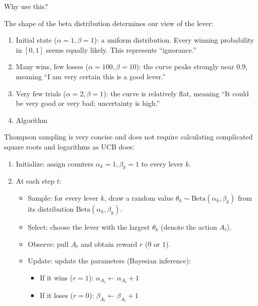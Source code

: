 Why use this?

The shape of the beta distribution determines our view of the lever:

\begin{enumerate}
\def\labelenumi{\arabic{enumi}.}
\item
  Initial state (\(\alpha=1,\beta=1\)): a uniform distribution. Every winning probability in \([0,1]\) seems equally likely. This represents ``ignorance.''
\item
  Many wins, few losses (\(\alpha=100,\beta=10\)): the curve peaks strongly near \(0.9\), meaning ``I am very certain this is a good lever.''
\item
  Very few trials (\(\alpha=2,\beta=1\)): the curve is relatively flat, meaning ``It could be very good or very bad; uncertainty is high.''
\item
  Algorithm
\end{enumerate}

Thompson sampling is very concise and does not require calculating complicated square roots and logarithms as UCB does:

\begin{enumerate}
\def\labelenumi{\arabic{enumi}.}
\tightlist
\item
  Initialize: assign counters \(\alpha_k=1,\beta_k=1\) to every lever \(k\).
\item
{}
  At each step \(t\):

  \begin{itemize}
  \item
    Sample: for every lever \(k\), draw a random value \(\theta_k\sim \mathrm{Beta}(\alpha_k,\beta_k)\) from its distribution \(\mathrm{Beta}(\alpha_k,\beta_k)\).
  \item
    Select: choose the lever with the largest \(\theta_k\) (denote the action \(A_t\)).
  \item
    Observe: pull \(A_t\) and obtain reward \(r\) (\(0\) or \(1\)).
  \item
{}
    Update: update the parameters (Bayesian inference):

    \begin{itemize}
    \tightlist
    \item
      If it wins (\(r=1\)): \(\alpha_{A_t}\leftarrow \alpha_{A_t}+1\)
    \item
      If it loses (\(r=0\)): \(\beta_{A_t}\leftarrow \beta_{A_t}+1\)
    \end{itemize}
  \end{itemize}
\end{enumerate}


